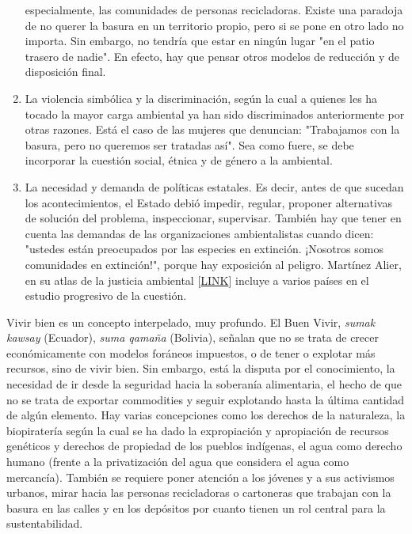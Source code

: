 \documentclass[
    a4paper,%
    DIV=calc,%
    abstract=true%
  ]{scrartcl}%
\begin{document}
\begin{enumerate}
    especialmente, las comunidades de personas recicladoras. Existe una
    paradoja de no querer la basura en un territorio propio, pero si se
    pone en otro lado no importa. Sin embargo, no tendría que estar en
    ningún lugar "en el patio trasero de nadie". En efecto, hay que
    pensar otros modelos de reducción y de disposición final.
  \item
    La violencia simbólica y la discriminación, según la cual a quienes
    les ha tocado la mayor carga ambiental ya han sido discriminados
    anteriormente por otras razones. Está el caso de las mujeres que
    denuncian: "Trabajamos con la basura, pero no queremos ser tratadas
    así". Sea como fuere, se debe incorporar la cuestión social, étnica
    y de género a la ambiental.
  \item
    La necesidad y demanda de políticas estatales. Es decir, antes de
    que sucedan los acontecimientos, el Estado debió impedir, regular,
    proponer alternativas de solución del problema, inspeccionar,
    supervisar. También hay que tener en cuenta las demandas de las
    organizaciones ambientalistas cuando dicen: "ustedes están
    preocupados por las especies en extinción. ¡Nosotros somos
    comunidades en extinción!", porque hay exposición al peligro.
    Martínez Alier, en su atlas de la justicia ambiental
    {[}\href{https://ejatlas.org/?translate=es}{LINK}{]} incluye a
    varios países en el estudio progresivo de la cuestión.
  \end{enumerate}

  Vivir bien es un concepto interpelado, muy profundo. El Buen Vivir,
  \emph{sumak kawsay} (Ecuador), \emph{suma qamaña} (Bolivia), señalan
  que no se trata de crecer económicamente con modelos foráneos
  impuestos, o de tener o explotar más recursos, sino de vivir bien. Sin
  embargo, está la disputa por el conocimiento, la necesidad de ir desde
  la seguridad hacia la soberanía alimentaria, el hecho de que no se
  trata de exportar commodities y seguir explotando hasta la última
  cantidad de algún elemento. Hay varias concepciones como los derechos
  de la naturaleza, la biopiratería según la cual se ha dado la
  expropiación y apropiación de recursos genéticos y derechos de
  propiedad de los pueblos indígenas, el agua como derecho humano
  (frente a la privatización del agua que considera el agua como
  mercancía). También se requiere poner atención a los jóvenes y a sus
  activismos urbanos, mirar hacia las personas recicladoras o cartoneras
  que trabajan con la basura en las calles y en los depósitos por cuanto
  tienen un rol central para la sustentabilidad.
\end{document}

